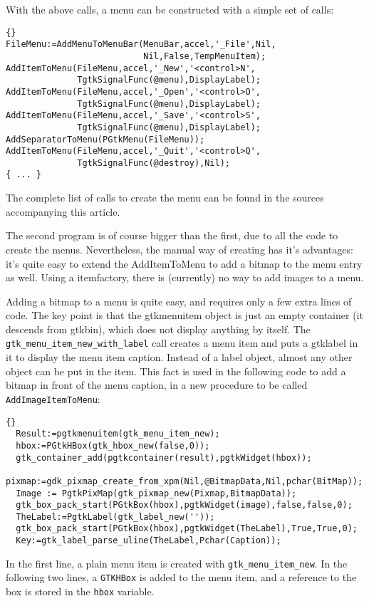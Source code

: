 \documentclass[10pt]{article}
\begin{document}
With the above calls, a menu can be constructed with a simple set of calls:
\begin{lstlisting}{}
FileMenu:=AddMenuToMenuBar(MenuBar,accel,'_File',Nil,
                           Nil,False,TempMenuItem);
AddItemToMenu(FileMenu,accel,'_New','<control>N',
              TgtkSignalFunc(@menu),DisplayLabel);
AddItemToMenu(FileMenu,accel,'_Open','<control>O',
              TgtkSignalFunc(@menu),DisplayLabel);
AddItemToMenu(FileMenu,accel,'_Save','<control>S',
              TgtkSignalFunc(@menu),DisplayLabel);
AddSeparatorToMenu(PGtkMenu(FileMenu));
AddItemToMenu(FileMenu,accel,'_Quit','<control>Q',
              TgtkSignalFunc(@destroy),Nil);
{ ... } 
\end{lstlisting}
The complete list of calls to create the menu can be found in the sources
accompanying this article.

The second program is of course bigger than the first, due to all the code
to create the menus. Nevertheless, the manual way of creating has it's
advantages: it's quite easy to extend the AddItemToMenu to add a bitmap to
the menu entry as well. Using a itemfactory, there is (currently) no way to
add images to a menu.

Adding a bitmap to a menu is quite easy, and requires only a few extra
lines of code. The key point is that the gtkmenuitem object is just an empty
container (it descends from gtkbin), which does not display anything by itself. The
\lstinline|gtk_menu_item_new_with_label| call creates a menu item and puts a
gtklabel in it to display the menu item caption. Instead of a label object,
almost any other object can be put in the item. This fact is used in the
following code to add a bitmap in front of the menu caption, in a new
procedure to be called \lstinline|AddImageItemToMenu|:
\begin{lstlisting}{}
  Result:=pgtkmenuitem(gtk_menu_item_new);
  hbox:=PGtkHBox(gtk_hbox_new(false,0));  
  gtk_container_add(pgtkcontainer(result),pgtkWidget(hbox));
  pixmap:=gdk_pixmap_create_from_xpm(Nil,@BitmapData,Nil,pchar(BitMap));
  Image := PgtkPixMap(gtk_pixmap_new(Pixmap,BitmapData));
  gtk_box_pack_start(PGtkBox(hbox),pgtkWidget(image),false,false,0);
  TheLabel:=PgtkLabel(gtk_label_new(''));
  gtk_box_pack_start(PGtkBox(hbox),pgtkWidget(TheLabel),True,True,0);
  Key:=gtk_label_parse_uline(TheLabel,Pchar(Caption));
\end{lstlisting}
In the first line, a plain menu item is created with
\lstinline|gtk_menu_item_new|. In the following two lines,
a \lstinline|GTKHBox| is added to the menu item, and a reference to the box
is stored in the \lstinline|hbox| variable.
\end{document}
